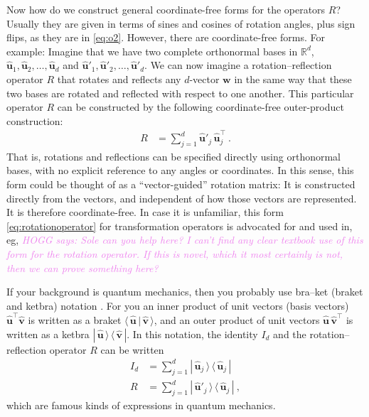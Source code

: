 \documentclass{article}
\newcommand{\Evec}[1]{{\mathbf{#1}}} %
\newcommand{\Ehat}[1]{{\mathbf{\hat{#1}}}} %
\newcommand{\braket}[2]{\langle\,{#1}\,|\,{#2}\,\rangle}
\newcommand{\ketbra}[2]{|\,{#1}\,\rangle\,\langle\,{#2}\,|}
\newcommand{\HOGG}[1]{\textcolor{violet}{\textsl{HOGG says: {#1}}}}
\begin{document}
Now how do we construct general coordinate-free forms for the operators $R$?
Usually they are given in terms of sines and cosines of rotation angles, plus sign flips, as they are in \eqref{eq:o2}.
However, there are coordinate-free forms.
For example: Imagine that we have two complete orthonormal bases in $\mathbb{R}^d$, $\Ehat{u}_1,\Ehat{u}_2,\ldots,\Ehat{u}_d$ and $\Ehat{u}'_1,\Ehat{u}'_2,\ldots,\Ehat{u}'_d$.
We can now imagine a rotation--reflection operator $R$ that rotates and reflects any $d$-vector $\Evec{w}$ in the same way that these two bases are rotated and reflected with respect to one another.
This particular operator $R$ can be constructed by the following coordinate-free outer-product construction:
\begin{align}
    R &= \sum_{j=1}^d \Ehat{u}'_j\,\Ehat{u}_j^\top ~.\label{eq:rotationoperator}
\end{align}
That is, rotations and reflections can be specified directly using orthonormal bases, with no explicit reference to any angles or coordinates.
In this sense, this form could be thought of as a ``vector-guided'' rotation matrix:
It is constructed directly from the vectors, and independent of how those vectors are represented.
It is therefore coordinate-free.
In case it is unfamiliar, this form \eqref{eq:rotationoperator} for transformation operators is advocated for and used in, eg, \HOGG{Sole can you help here? I can't find any clear textbook use of this form for the rotation operator. If this is novel, which it most certainly is not, then we can prove something here?}

If your background is quantum mechanics, then you probably use bra--ket (braket and ketbra) notation \cite{dirac}.
For you an inner product of unit vectors (basis vectors) $\Ehat{u}^\top\Ehat{v}$ is written as a braket $\braket{\Ehat{u}}{\Ehat{v}}$, and an outer product of unit vectors $\Ehat{u}\,\Ehat{v}^\top$ is written as a ketbra $\ketbra{\Ehat{u}}{\Ehat{v}}$.
In this notation, the identity $I_d$ and the rotation--reflection operator $R$ can be written 
\begin{align}
    I_d &= \sum_{j=1}^d \ketbra{\Ehat{u}_j}{\Ehat{u}_j} \\
    R   &= \sum_{j=1}^d \ketbra{\Ehat{u}'_j}{\Ehat{u}_j} \label{eq:rotationoperatorQM}~,
\end{align}
which are famous kinds of expressions in quantum mechanics.
\end{document}
